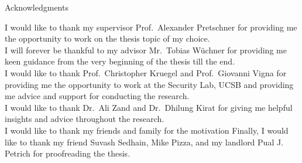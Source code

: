 \thispagestyle{empty}

\vspace*{2cm}

\begin{center}
{ Acknowledgments}
\end{center}

\vspace{1cm}

I would like to thank my supervisor Prof.\ Alexander Pretschner for providing me the opportunity to work on the thesis topic of my choice.\\
I will forever be thankful to my advisor Mr.\ Tobias Wüchner for providing me keen guidance from the very beginning of the thesis till the end.\\

I would like to thank Prof.\ Christopher Kruegel and Prof.\ Giovanni Vigna for providing me the opportunity to work at the Security Lab, UCSB and providing me advice and support for conducting the research.\\
I would like to thank Dr.\ Ali Zand and Dr.\ Dhilung Kirat for giving me helpful insights and advice throughout the research.\\

I would like to thank my friends and family for the motivation 
Finally, I would like to thank my friend Suvash Sedhain, Mike Pizza, and my landlord Pual J. Petrich for proofreading the thesis.

\cleardoublepage{}
